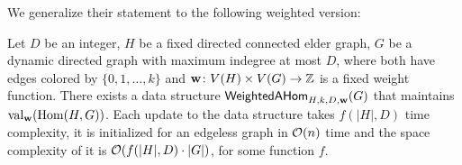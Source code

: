 We generalize their statement to the following weighted version:

\begin{lemma} \label{lem:weighted-ahom}
	Let $D$ be an integer, $H$ be a fixed directed connected elder graph, $G$ be a dynamic directed graph with maximum indegree at most $D$, where both have edges colored by $\{0, 1, \ldots, k\}$ and $\mathbf{w} \colon V(H) \times V(G) \to \mathbb{Z}$ is a fixed weight function. There exists a data structure $\mathsf{WeightedAHom}_{H, k, D, \mathbf{w}}(G)$ that maintains $\mathrm{val}_{\mathbf{w}}(\mathrm{Hom}(H, G))$. Each update to the data structure takes $f(|H|, D)$ time complexity, it is initialized for an edgeless graph in $\mathcal{O}(n)$ time and the space complexity of it is $\mathcal{O}(f(|H|, D) \cdot |G|)$, for some function $f$.%
\end{lemma}


